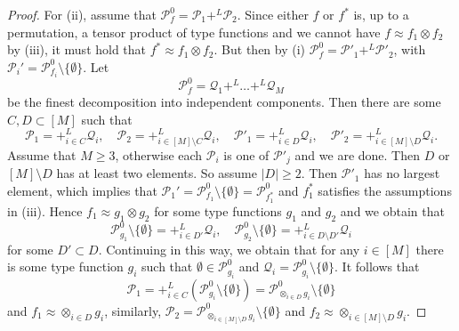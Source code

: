 \documentclass[12pt]{article}
\theoremstyle{definition}
\theoremstyle{remark}
\def\Indep{+^L}
\def\indep{+^L}
\def\Pe{\mathcal P}
\begin{document}
\begin{proof}
For (ii), assume that $\Pe_f^0=\Pe_1\indep \Pe_2$. Since either $f$ or $f^*$ is, up to a
permutation, a tensor
product of type functions and we cannot have $f\approx f_1\otimes f_2$ by (iii), 
 it must hold that $f^*\approx f_1\otimes f_2$. But then by (i) $\Pe_f^0=\Pe'_1\indep \Pe'_2$, with 
$\Pe_i'=\Pe^0_{f_i}\setminus \{\emptyset\}$. Let 
\[
\Pe_f^0=\mathcal Q_1\indep \dots \indep  \mathcal Q_M
\]
be the finest decomposition into independent components. Then there are some $C,D\subset [M]$
such that 
\[
\Pe_1=\Indep_{i\in C} \mathcal Q_i,\quad  \Pe_2=\Indep_{i\in [M]\setminus C} \mathcal
Q_i, \quad \Pe'_1=\Indep_{i\in D} \mathcal Q_i,\quad  \Pe'_2=\Indep_{i\in [M]\setminus D}
\mathcal Q_i.
\]
Assume that $M\ge 3$, otherwise each $\Pe_i$ is one of $\Pe'_j$ and we are done. 
Then $D$ or $[M]\setminus D$ has at least two elements. So assume $|D|\ge 2$. Then $\Pe'_1$ has no largest
 element, which implies that $\Pe_1'=\Pe_{f_1}^0\setminus\{\emptyset\}=\Pe_{f_1^*}^0$ and $f_1^*$ satisfies the assumptions
 in (iii). Hence $f_1\approx g_1\otimes g_2$ for some type functions $g_1$ and $g_2$ and we
 obtain that 
 \[
\Pe_{g_1}^0\setminus \{\emptyset\} = +_{i\in D'}^L \mathcal Q_i,\quad \Pe_{g_2}^0\setminus
\{\emptyset\} = +_{i\in D\setminus D'}^L\mathcal Q_i
 \]
for some $D'\subset D$. Continuing in this way, we obtain that for any $i\in [M]$ there is
some type function $g_i$ such that $\emptyset \in \Pe_{g_i}^0$ and $\mathcal
Q_i=\Pe_{g_i}^0\setminus \{\emptyset\}$. It follows that 
\[
\Pe_1=+^L_{i\in C}(\Pe_{g_i}^0\setminus \{\emptyset\})=\Pe^0_{\otimes_{i\in
D}g_i}\setminus\{\emptyset\}
\]
and $f_1\approx \otimes_{i\in D}g_i$, similarly, $\Pe_2=\Pe^0_{\otimes_{i\in
[M]\setminus D}g_i}\setminus\{\emptyset\}$ and $f_2\approx\otimes_{i\in [M]\setminus
D}g_i$. 


\end{proof}
\end{document}
